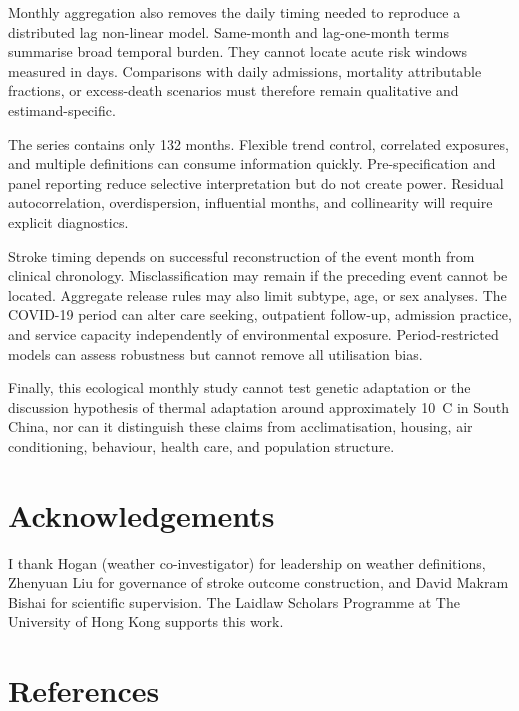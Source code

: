 \documentclass[11pt,a4paper]{article}
\begin{document}
Monthly aggregation also removes the daily timing needed to reproduce a distributed lag non-linear model. Same-month and lag-one-month terms summarise broad temporal burden. They cannot locate acute risk windows measured in days. Comparisons with daily admissions, mortality attributable fractions, or excess-death scenarios must therefore remain qualitative and estimand-specific.

The series contains only 132 months. Flexible trend control, correlated exposures, and multiple definitions can consume information quickly. Pre-specification and panel reporting reduce selective interpretation but do not create power. Residual autocorrelation, overdispersion, influential months, and collinearity will require explicit diagnostics.

Stroke timing depends on successful reconstruction of the event month from clinical chronology. Misclassification may remain if the preceding event cannot be located. Aggregate release rules may also limit subtype, age, or sex analyses. The COVID-19 period can alter care seeking, outpatient follow-up, admission practice, and service capacity independently of environmental exposure. Period-restricted models can assess robustness but cannot remove all utilisation bias.

Finally, this ecological monthly study cannot test genetic adaptation or the discussion hypothesis of thermal adaptation around approximately 10~\textdegree C in South China, nor can it distinguish these claims from acclimatisation, housing, air conditioning, behaviour, health care, and population structure.

\section*{Acknowledgements}

I thank Hogan (weather co-investigator) for leadership on weather definitions, Zhenyuan Liu for governance of stroke outcome construction, and David Makram Bishai for scientific supervision. The Laidlaw Scholars Programme at The University of Hong Kong supports this work.

\section*{References}
\end{document}
